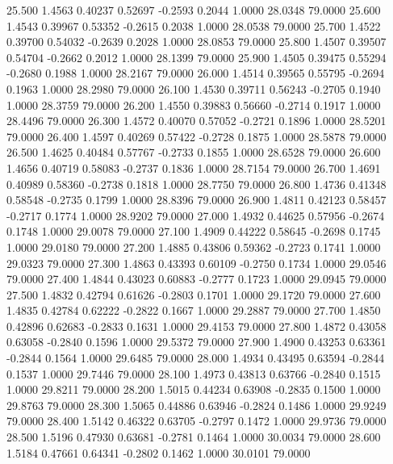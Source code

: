   25.500   1.4563   0.40237   0.52697  -0.2593   0.2044   1.0000  28.0348  79.0000
  25.600   1.4543   0.39967   0.53352  -0.2615   0.2038   1.0000  28.0538  79.0000
  25.700   1.4522   0.39700   0.54032  -0.2639   0.2028   1.0000  28.0853  79.0000
  25.800   1.4507   0.39507   0.54704  -0.2662   0.2012   1.0000  28.1399  79.0000
  25.900   1.4505   0.39475   0.55294  -0.2680   0.1988   1.0000  28.2167  79.0000
  26.000   1.4514   0.39565   0.55795  -0.2694   0.1963   1.0000  28.2980  79.0000
  26.100   1.4530   0.39711   0.56243  -0.2705   0.1940   1.0000  28.3759  79.0000
  26.200   1.4550   0.39883   0.56660  -0.2714   0.1917   1.0000  28.4496  79.0000
  26.300   1.4572   0.40070   0.57052  -0.2721   0.1896   1.0000  28.5201  79.0000
  26.400   1.4597   0.40269   0.57422  -0.2728   0.1875   1.0000  28.5878  79.0000
  26.500   1.4625   0.40484   0.57767  -0.2733   0.1855   1.0000  28.6528  79.0000
  26.600   1.4656   0.40719   0.58083  -0.2737   0.1836   1.0000  28.7154  79.0000
  26.700   1.4691   0.40989   0.58360  -0.2738   0.1818   1.0000  28.7750  79.0000
  26.800   1.4736   0.41348   0.58548  -0.2735   0.1799   1.0000  28.8396  79.0000
  26.900   1.4811   0.42123   0.58457  -0.2717   0.1774   1.0000  28.9202  79.0000
  27.000   1.4932   0.44625   0.57956  -0.2674   0.1748   1.0000  29.0078  79.0000
  27.100   1.4909   0.44222   0.58645  -0.2698   0.1745   1.0000  29.0180  79.0000
  27.200   1.4885   0.43806   0.59362  -0.2723   0.1741   1.0000  29.0323  79.0000
  27.300   1.4863   0.43393   0.60109  -0.2750   0.1734   1.0000  29.0546  79.0000
  27.400   1.4844   0.43023   0.60883  -0.2777   0.1723   1.0000  29.0945  79.0000
  27.500   1.4832   0.42794   0.61626  -0.2803   0.1701   1.0000  29.1720  79.0000
  27.600   1.4835   0.42784   0.62222  -0.2822   0.1667   1.0000  29.2887  79.0000
  27.700   1.4850   0.42896   0.62683  -0.2833   0.1631   1.0000  29.4153  79.0000
  27.800   1.4872   0.43058   0.63058  -0.2840   0.1596   1.0000  29.5372  79.0000
  27.900   1.4900   0.43253   0.63361  -0.2844   0.1564   1.0000  29.6485  79.0000
  28.000   1.4934   0.43495   0.63594  -0.2844   0.1537   1.0000  29.7446  79.0000
  28.100   1.4973   0.43813   0.63766  -0.2840   0.1515   1.0000  29.8211  79.0000
  28.200   1.5015   0.44234   0.63908  -0.2835   0.1500   1.0000  29.8763  79.0000
  28.300   1.5065   0.44886   0.63946  -0.2824   0.1486   1.0000  29.9249  79.0000
  28.400   1.5142   0.46322   0.63705  -0.2797   0.1472   1.0000  29.9736  79.0000
  28.500   1.5196   0.47930   0.63681  -0.2781   0.1464   1.0000  30.0034  79.0000
  28.600   1.5184   0.47661   0.64341  -0.2802   0.1462   1.0000  30.0101  79.0000
